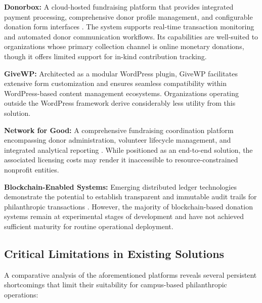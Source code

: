 \documentclass{thesis-library}
\begin{document}
\textbf{Donorbox:} A cloud-hosted fundraising platform that provides integrated payment processing, comprehensive donor profile management, and configurable donation form interfaces \cite{barnes2018rise}. The system supports real-time transaction monitoring and automated donor communication workflows. Its capabilities are well-suited to organizations whose primary collection channel is online monetary donations, though it offers limited support for in-kind contribution tracking.

\textbf{GiveWP:} Architected as a modular WordPress plugin, GiveWP facilitates extensive form customization and ensures seamless compatibility within WordPress-based content management ecosystems. Organizations operating outside the WordPress framework derive considerably less utility from this solution.

\textbf{Network for Good:} A comprehensive fundraising coordination platform encompassing donor administration, volunteer lifecycle management, and integrated analytical reporting \cite{schlegelmilch2022strategic}. While positioned as an end-to-end solution, the associated licensing costs may render it inaccessible to resource-constrained nonprofit entities.

\textbf{Blockchain-Enabled Systems:} Emerging distributed ledger technologies demonstrate the potential to establish transparent and immutable audit trails for philanthropic transactions \cite{huang2020online}. However, the majority of blockchain-based donation systems remain at experimental stages of development and have not achieved sufficient maturity for routine operational deployment.


\subsection{Critical Limitations in Existing Solutions}

A comparative analysis of the aforementioned platforms reveals several persistent shortcomings that limit their suitability for campus-based philanthropic operations:
\end{document}
